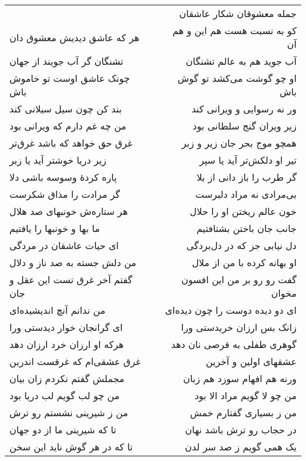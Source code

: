 \begin{center}
\begin{longtable}{l p{0.5cm} r}
&&
جمله معشوقان شکار عاشقان
\\
هر که عاشق دیدیش معشوق دان
&&
کو به نسبت هست هم این و هم آن
\\
تشنگان گر آب جویند از جهان
&&
آب جوید هم به عالم تشنگان
\\
چونک عاشق اوست تو خاموش باش
&&
او چو گوشت می‌کشد تو گوش باش
\\
بند کن چون سیل سیلانی کند
&&
ور نه رسوایی و ویرانی کند
\\
من چه غم دارم که ویرانی بود
&&
زیر ویران گنج سلطانی بود
\\
غرق حق خواهد که باشد غرق‌تر
&&
همچو موج بحر جان زیر و زبر
\\
زیر دریا خوشتر آید یا زبر
&&
تیر او دلکش‌تر آید یا سپر
\\
پاره کردهٔ وسوسه باشی دلا
&&
گر طرب را باز دانی از بلا
\\
گر مرادت را مذاق شکرست
&&
بی‌مرادی نه مراد دلبرست
\\
هر ستاره‌ش خونبهای صد هلال
&&
خون عالم ریختن او را حلال
\\
ما بها و خونبها را یافتیم
&&
جانب جان باختن بشتافتیم
\\
ای حیات عاشقان در مردگی
&&
دل نیابی جز که در دل‌بردگی
\\
من دلش جسته به صد ناز و دلال
&&
او بهانه کرده با من از ملال
\\
گفتم آخر غرق تست این عقل و جان
&&
گفت رو رو بر من این افسون مخوان
\\
من ندانم آنچ اندیشیده‌ای
&&
ای دو دیده دوست را چون دیده‌ای
\\
ای گرانجان خوار دیدستی ورا
&&
زانک بس ارزان خریدستی ورا
\\
هرکه او ارزان خرد ارزان دهد
&&
گوهری طفلی به قرصی نان دهد
\\
غرق عشقی‌ام که غرقست اندرین
&&
عشقهای اولین و آخرین
\\
مجملش گفتم نکردم زان بیان
&&
ورنه هم افهام سوزد هم زبان
\\
من چو لب گویم لب دریا بود
&&
من چو لا گویم مراد الا بود
\\
من ز شیرینی نشستم رو ترش
&&
من ز بسیاری گفتارم خمش
\\
تا که شیرینی ما از دو جهان
&&
در حجاب رو ترش باشد نهان
\\
تا که در هر گوش ناید این سخن
&&
یک همی گویم ز صد سر لدن
\\
\end{longtable}
\end{center}
